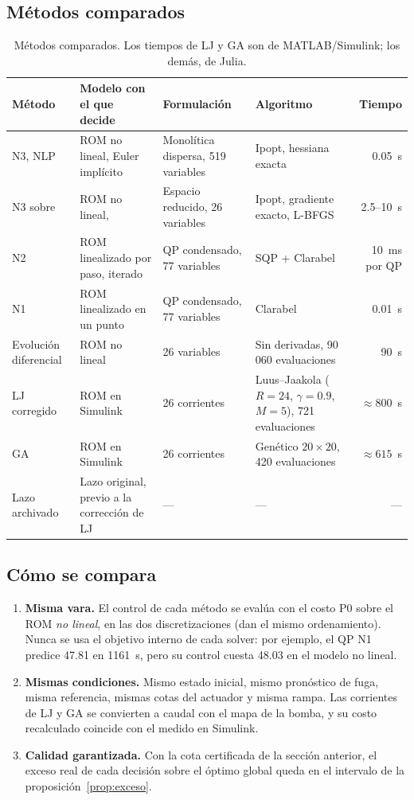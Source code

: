 \subsection{Métodos comparados}
\begin{table}[H]\centering\footnotesize\setlength{\tabcolsep}{3pt}
\begin{tabularx}{\linewidth}{@{}>{\raggedright\arraybackslash}p{24mm} Y Y Y r@{}}\toprule
Método & Modelo con el que decide & Formulación & Algoritmo & Tiempo\\\midrule
N3, NLP & ROM no lineal, Euler implícito & Monolítica dispersa, 519 variables & Ipopt, hessiana exacta & 0.05~s\\
N3 sobre  & ROM no lineal,  & Espacio reducido, 26 variables & Ipopt, gradiente exacto, L-BFGS & 2.5--10~s\\
N2 & ROM linealizado por paso, iterado & QP condensado, 77 variables & SQP + Clarabel & 10~ms por QP\\
N1 & ROM linealizado en un punto & QP condensado, 77 variables & Clarabel & 0.01~s\\
Evolución diferencial & ROM no lineal & 26 variables & Sin derivadas, 90\,060 evaluaciones & 90~s\\
LJ corregido & ROM en Simulink & 26 corrientes & Luus--Jaakola ($R=24$, $\gamma=0.9$, $M=5$), 721 evaluaciones & $\approx800$~s\\
GA & ROM en Simulink & 26 corrientes & Genético $20\times20$, 420 evaluaciones & $\approx615$~s\\
Lazo archivado & Lazo original, previo a la corrección de LJ & --- & --- & ---\\\bottomrule
\end{tabularx}
\caption{Métodos comparados. Los tiempos de LJ y GA son de MATLAB/Simulink; los demás, de
Julia.}
\end{table}

\subsection{Cómo se compara}
\begin{enumerate}
  \item \textbf{Misma vara.} El control de cada método se evalúa con el costo P0 sobre el
        ROM \emph{no lineal}, en las dos discretizaciones (dan el mismo ordenamiento). Nunca
        se usa el objetivo interno de cada solver: por ejemplo, el QP N1 predice 47.81 en
        1161~s, pero su control cuesta 48.03 en el modelo no lineal.
  \item \textbf{Mismas condiciones.} Mismo estado inicial, mismo pronóstico de fuga, misma
        referencia, mismas cotas del actuador y misma rampa. Las corrientes de LJ y GA se
        convierten a caudal con el mapa de la bomba, y su costo recalculado coincide con el
        medido en Simulink.
  \item \textbf{Calidad garantizada.} Con la cota certificada de la sección anterior, el
        exceso real de cada decisión sobre el óptimo global queda en el intervalo de la
        proposición~\ref{prop:exceso}.
\end{enumerate}

